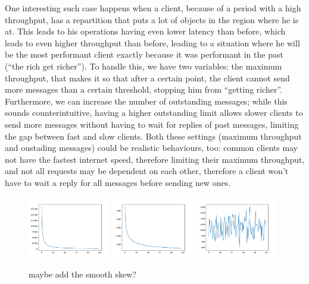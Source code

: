 One interesting such case happens when a client, because of a period with a high throughput, has a repartition that puts a lot of objects in the region where he is at. This leads to his operations having even lower latency than before, which leads to even higher throughput than before, leading to a situation where he will be the most performant client exactly because it was performant in the past (``the rich get richer''). To handle this, we have two variables: the maximum throughput, that makes it so that after a certain point, the client cannot send more messages than a certain threshold, stopping him from ``getting richer''. Furthermore, we can increase the number of outstanding messages; while this sounds counterintuitive, having a higher outstanding limit allows slower clients to send more messages without having to wait for replies of past messages, limiting the gap between fast and slow clients. Both these settings (maximum throughput and oustading messages) could be realistic behaviours, too: common clients may not have the fastest internet speed, therefore limiting their maximum throughput, and not all requests may be dependent on each other, therefore a client won't have to wait a reply for all messages before sending new ones.

\begin{figure}[htb]
  \centering
  \includegraphics[width=0.32\textwidth,height=\textheight,keepaspectratio]{img/skew-alpha1.png}
  \includegraphics[width=0.32\textwidth,height=\textheight,keepaspectratio]{img/skew-alpha05.png}
  \includegraphics[width=0.32\textwidth,height=\textheight,keepaspectratio]{img/skew-alpha0.png}
  \caption[The architecture of the system]{ maybe add the smooth skew? }
  \label{fig:b+tree}
\end{figure}

